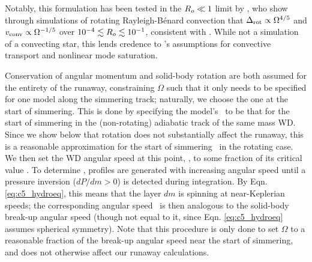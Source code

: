 


Notably, this formulation has been tested in the $\rossby \ll 1$ limit by \cite{barkdl14}, who show through simulations of rotating Rayleigh-B\'{e}nard convection that $\dnabrot \propto \Omega^{4/5}$ and $\vconv \propto \Omega^{-1/5}$ over $10^{-4} \lesssim \rossby \lesssim 10^{-1}$, consistent with \citeal{stev79}.  While not a simulation of a convecting star, this lends credence to \citeal{stev79}'s assumptions for convective transport and nonlinear mode saturation.


Conservation of angular momentum and solid-body rotation are both assumed for the entirety of the runaway, constraining $\Omega$ such that it only needs to be specified for one model along the simmering track; naturally, we choose the one at the start of simmering.  This is done by specifying the model's \Sc\ to be that for the start of simmering in the (non-rotating) adiabatic track of the same mass WD.  Since we show below that rotation does not substantially affect the runaway, this is a reasonable approximation for the start of simmering \Sc\ in the rotating case.  We then set the WD angular speed at this point, \Ominit, to some fraction of its critical value \Omcrit.  To determine \Omcrit, profiles are generated with increasing angular speed until a pressure inversion ($dP/dm > 0$) is detected during integration.  By Eqn. \ref{eq:c5_hydroeq}, this means that the layer $dm$ is spinning at near-Keplerian speeds; the corresponding angular speed \Omcrit\ is then analogous to the solid-body break-up angular speed (though not equal to it, since Eqn. \ref{eq:c5_hydroeq} assumes spherical symmetry).  Note that this procedure is only done to set $\Omega$ to a reasonable fraction of the break-up angular speed near the start of simmering, and does not otherwise affect our runaway calculations.

